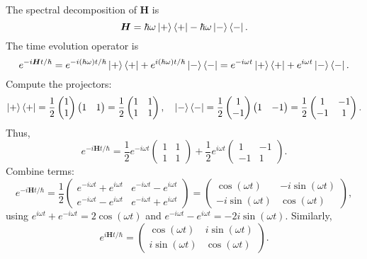 \documentclass[a4paper,12pt]{article}
\begin{document}
The spectral decomposition of \(\boldsymbol{H}\) is
\[
\boldsymbol{H} = \hbar \omega \ket{+} \bra{+} - \hbar \omega \ket{-} \bra{-}.
\]
The time evolution operator is
\[
e^{-i \boldsymbol{H} t / \hbar} = e^{-i (\hbar \omega) t / \hbar} \ket{+} \bra{+} + e^{i (\hbar \omega) t / \hbar} \ket{-} \bra{-} = e^{-i \omega t} \ket{+} \bra{+} + e^{i \omega t} \ket{-} \bra{-}.
\]
Compute the projectors:
\[
\ket{+} \bra{+} = \frac{1}{2} \begin{pmatrix} 1 \\ 1 \end{pmatrix} \begin{pmatrix} 1 & 1 \end{pmatrix} = \frac{1}{2} \begin{pmatrix} 1 & 1 \\ 1 & 1 \end{pmatrix}, \quad \ket{-} \bra{-} = \frac{1}{2} \begin{pmatrix} 1 \\ -1 \end{pmatrix} \begin{pmatrix} 1 & -1 \end{pmatrix} = \frac{1}{2} \begin{pmatrix} 1 & -1 \\ -1 & 1 \end{pmatrix}.
\]
Thus,
\[
e^{-i \boldsymbol{H} t / \hbar} = \frac{1}{2} e^{-i \omega t} \begin{pmatrix} 1 & 1 \\ 1 & 1 \end{pmatrix} + \frac{1}{2} e^{i \omega t} \begin{pmatrix} 1 & -1 \\ -1 & 1 \end{pmatrix}.
\]
Combine terms:
\[
e^{-i \boldsymbol{H} t / \hbar} = \frac{1}{2} \begin{pmatrix} e^{-i \omega t} + e^{i \omega t} & e^{-i \omega t} - e^{i \omega t} \\ e^{-i \omega t} - e^{i \omega t} & e^{-i \omega t} + e^{i \omega t} \end{pmatrix} = \begin{pmatrix} \cos(\omega t) & -i \sin(\omega t) \\ -i \sin(\omega t) & \cos(\omega t) \end{pmatrix},
\]
using \(e^{i \omega t} + e^{-i \omega t} = 2 \cos(\omega t)\) and \(e^{-i \omega t} - e^{i \omega t} = -2i \sin(\omega t)\). Similarly,
\[
e^{i \boldsymbol{H} t / \hbar} = \begin{pmatrix} \cos(\omega t) & i \sin(\omega t) \\ i \sin(\omega t) & \cos(\omega t) \end{pmatrix}.
\]
\end{document}
